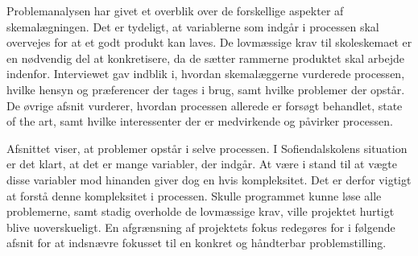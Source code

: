 Problemanalysen har givet et overblik over de forskellige aspekter af skemalægningen. Det er tydeligt, at variablerne som indgår i processen skal overvejes for at et godt produkt kan laves. De lovmæssige krav til skoleskemaet er en nødvendig del at konkretisere, da de sætter rammerne produktet skal arbejde indenfor. Interviewet gav indblik i, hvordan skemalæggerne vurderede processen, hvilke hensyn og præferencer der tages i brug, samt hvilke problemer der opstår. De øvrige afsnit vurderer, hvordan processen allerede er forsøgt behandlet, state of the art, samt hvilke interessenter der er medvirkende og påvirker processen.

Afsnittet viser, at problemer opstår i selve processen. I Sofiendalskolens situation er det klart, at det er mange variabler, der indgår. At være i stand til at vægte disse variabler mod hinanden giver dog en hvis kompleksitet. Det er derfor vigtigt at forstå denne kompleksitet i processen. Skulle programmet kunne løse alle problemerne, samt stadig overholde de lovmæssige krav, ville projektet hurtigt blive uoverskueligt. En afgrænsning af projektets fokus redegøres for i følgende afsnit for at indsnævre fokusset til en konkret og håndterbar problemstilling.
